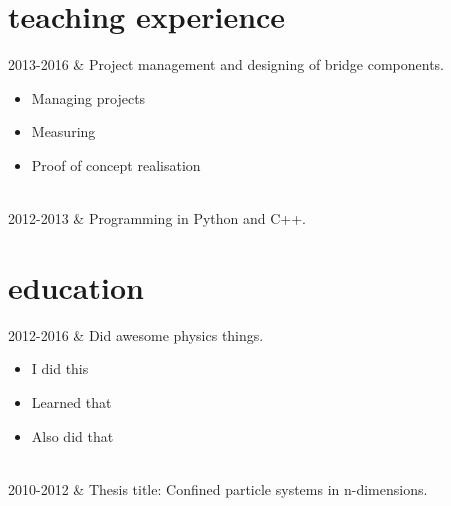 \documentclass[
    changecolor={70,130,180}, 
]{cv-roald}
\newcommand{\paw}{\faPaw \hspace{.5mm}}
\begin{document}
\section*{\paw{} teaching experience}
\begin{tabularcv}
2013-2016   &   
                \newline Project management and designing of bridge
                components.
                \begin{itemize}
                  \item Managing projects
                  \item Measuring
                  \item Proof of concept realisation
                \end{itemize} 
                \\
                
2012-2013   &   
                \newline Programming in Python and C++.
\end{tabularcv}

\section*{\paw{} education}
\begin{tabularcv}
2012-2016   &   
                \newline Did awesome physics things.
                \begin{itemize}
                  \item I did this 
                  \item Learned that
                  \item Also did that
                \end{itemize} 
                \\
                
2010-2012   &   
                \newline Thesis title: Confined particle systems in
                n-dimensions.
\end{tabularcv}
\end{document}
